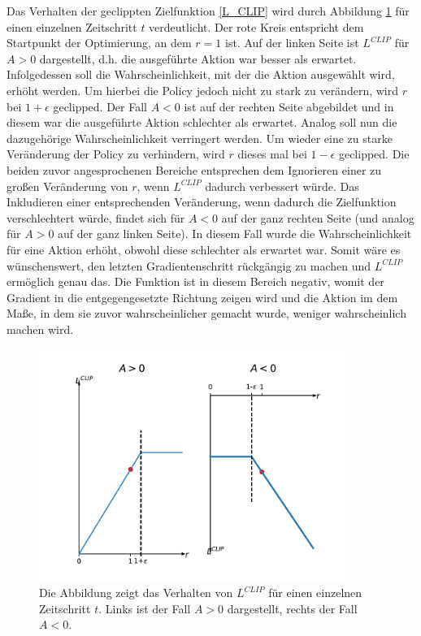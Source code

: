Das Verhalten der geclippten Zielfunktion \eqref{L_CLIP} wird durch Abbildung \ref{fig_L_clip} für einen einzelnen Zeitschritt $t$ verdeutlicht. Der rote Kreis entspricht dem Startpunkt der Optimierung, an dem $r = 1$ ist. Auf der linken Seite ist $L^{CLIP}$ für $A > 0$ dargestellt, d.h. die ausgeführte Aktion war besser als erwartet. Infolgedessen soll die Wahrscheinlichkeit, mit der die Aktion ausgewählt wird, erhöht werden. Um hierbei die Policy jedoch nicht zu stark zu verändern, wird $r$ bei $1+\epsilon$ geclipped. Der Fall $A < 0$ ist auf der rechten Seite abgebildet und in diesem war die ausgeführte Aktion schlechter als erwartet. Analog soll nun die dazugehörige Wahrscheinlichkeit verringert werden. Um wieder eine zu starke Veränderung der Policy zu verhindern, wird $r$ dieses mal bei $1-\epsilon$ geclipped. Die beiden zuvor angesprochenen Bereiche entsprechen dem Ignorieren einer zu großen Veränderung von $r$, wenn $L^{CLIP}$ dadurch verbessert würde. Das Inkludieren einer entsprechenden Veränderung, wenn dadurch die Zielfunktion verschlechtert würde, findet sich für $A < 0$ auf der ganz rechten Seite (und analog für $A > 0$ auf der ganz linken Seite). In diesem Fall wurde die Wahrscheinlichkeit für eine Aktion erhöht, obwohl diese schlechter als erwartet war. Somit wäre es wünschenswert, den letzten Gradientenschritt rückgängig zu machen und $L^{CLIP}$ ermöglich genau das. Die Funktion ist in diesem Bereich negativ, womit der Gradient in die entgegengesetzte Richtung zeigen wird und die Aktion im dem Maße, in dem sie zuvor wahrscheinlicher gemacht wurde, weniger wahrscheinlich machen wird. \\

\begin{figure}[ht!]
  \centering
  \includegraphics[height=0.5\textwidth, width=0.9\textwidth]{abbildungen/L_clip.pdf}
  \caption{Die Abbildung zeigt das Verhalten von $L^{CLIP}$ für einen einzelnen Zeitschritt $t$. Links ist der Fall $A > 0$ dargestellt, rechts der Fall $A < 0$.}
  \label{fig_L_clip}
\end{figure}

